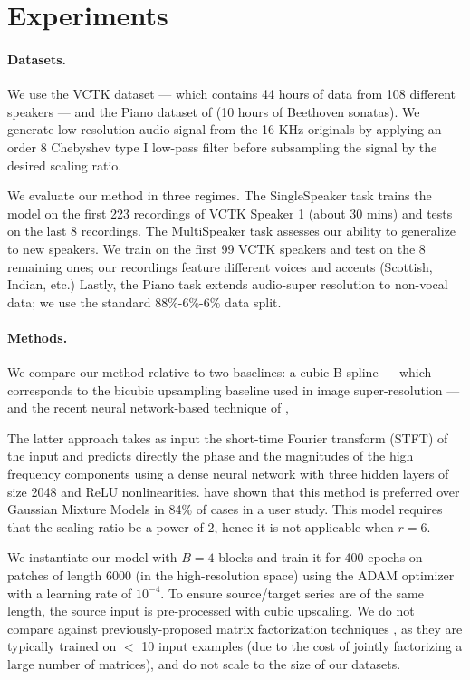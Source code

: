 \documentclass{article} \usepackage{iclr2017_workshop,times}
\begin{document}
\section{Experiments}

\paragraph{Datasets.} 

We use the VCTK dataset \citep{yamagishienglish} --- which contains 44 hours of data from 108 different speakers --- and the Piano dataset of \citet{mehri2016samplernn} (10 hours of  Beethoven sonatas). 
We generate low-resolution audio signal from the 16 KHz originals by applying an order 8 Chebyshev type I low-pass filter before subsampling the signal by the desired scaling ratio.

We evaluate our method in three regimes.
The {\sc SingleSpeaker} task trains the model on the first 223 recordings of VCTK Speaker 1 (about 30 mins) and tests on the last 8 recordings.
The {\sc MultiSpeaker} task assesses our ability to generalize to new speakers. We train on the first 99 VCTK speakers and test on the 8 remaining ones; our recordings feature different voices and accents (Scottish, Indian, etc.)
Lastly, the {\sc Piano} task extends audio-super resolution to non-vocal data; we use the standard 88\%-6\%-6\% data split.


\paragraph{Methods.}

We compare our method relative to two baselines: a cubic B-spline --- which corresponds to the bicubic upsampling baseline used in image super-resolution --- and the recent neural network-based technique of \citet{li2015dnn}, 



The latter approach takes as input the short-time Fourier transform (STFT) of the input and predicts directly the phase and the magnitudes of the high frequency components using a dense neural network with three hidden layers of size 2048 and ReLU nonlinearities.
\citet{li2015dnn} have shown that this method is preferred over Gaussian Mixture Models in 84\% of cases in a user study.
This model requires that the scaling ratio be a power of $2$, hence it is not applicable when $r=6$.


We instantiate our model with $B=4$ blocks and train it for 400 epochs on patches of length 6000 (in the high-resolution space) using the ADAM optimizer with a learning rate of $10^{-4}$. To ensure source/target series are of the same length, the source input is pre-processed with cubic upscaling.
We do not compare against previously-proposed matrix factorization techniques \citep{Bansal05bandwidthexpansion,DBLP:conf/ismir/LiangHE13}, as they are typically trained on $<$ 10 input examples \citep{DBLP:conf/mlsp/SunM13} (due to the cost of jointly factorizing a large number of matrices), and do not scale to the size of our datasets.
\end{document}

